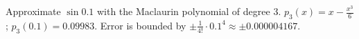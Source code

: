 {Approximate $\sin 0.1$ with the Maclaurin polynomial of degree 3.
}
{$p_3(x) =x-\frac{x^3}{6}$; $p_3(0.1) = 0.09983$. Error is bounded by $\pm \frac{1}{4!}\cdot0.1^4 \approx \pm 0.000004167$.
}